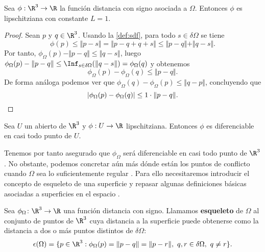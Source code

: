 \begin{lema}
    Sea $\phi:\R^3\to \R$ la función distancia con signo asociada a $\Omega$. Entonces $\phi$ es lipschitziana con constante $L=1$.
\end{lema}
\begin{proof}
    Sean $p$ y $q\in \R^3$. Usando la \autoref{def:sdf}, para todo $s\in \delta\Omega$ se tiene
    \begin{equation*}
        \phi(p) \le \Vert p-s\Vert = \Vert p-q+q+s\Vert \le \Vert p-q\Vert + \Vert q-s\Vert.
    \end{equation*}
    Por tanto, $\phi_{\Omega}(p) - \Vert p-q\Vert \le \Vert q-s \Vert$, luego $\phi_{\Omega}(p) - \Vert p-q\Vert \le \Inf_{s\in \delta\Omega}(\Vert q-s \Vert) = \phi_{\Omega}(q)$ y obtenemos
    \begin{equation*}
         \phi_{\Omega}(p) - \phi_{\Omega}(q) \le \Vert p-q \Vert.
    \end{equation*}
    De forma análoga podemos ver que $\phi_{\Omega}(q) - \phi_{\Omega}(p) \le \Vert q-p \Vert$, concluyendo que
    \begin{equation*}
        \vert \phi_{\Omega}(p) - \phi_{\Omega}(q)\vert \le 1\cdot \Vert p-q\Vert.\qedhere
    \end{equation*}
\end{proof}

\begin{lema}
    Sea $U$ un abierto de $\R^3$ y $\phi:U\to \R$ lipschitziana. Entonces $\phi$ es diferenciable en casi todo punto de $U$.
\end{lema}

Tenemos por tanto asegurado que $\phi_{\Omega}$ será diferenciable en casi todo punto de $\R^3$. No obstante, podemos concretar aún más dónde están los puntos de conflicto cuando $\Omega$ sea lo suficientemente regular \cite{dif1,dif2}. Para ello necesitaremos introducir el concepto de esqueleto de una superficie \cite{derivWiki} y repasar algunas definiciones básicas asociadas a superficies en el espacio \cite{apuntes:curvas}.
\begin{definicion}
    Sea $\phi_{\Omega} \colon \R^3\to \R$ una función distancia con signo. Llamamos \textbf{esqueleto} de $\Omega$ al conjunto de puntos de $\R^3$ cuya distancia a la superficie puede obtenerse como la distancia a dos o más puntos distintos de $\delta \Omega$:
    \begin{equation}
        \epsilon(\Omega) = \{p\in \R^3 : \phi_{\Omega}(p) = \Vert p-q\Vert = \Vert p-r\Vert,\ q,r\in \delta\Omega ,\ q\neq r \}.
    \end{equation}
\end{definicion}

